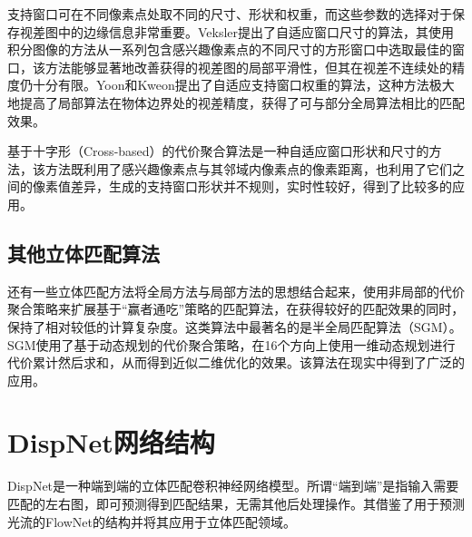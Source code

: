 支持窗口可在不同像素点处取不同的尺寸、形状和权重，而这些参数的选择对于保存视差图中的边缘信息非常重要。Veksler\cite{veksler2003fast}提出了自适应窗口尺寸的算法，其使用积分图像的方法从一系列包含感兴趣像素点的不同尺寸的方形窗口中选取最佳的窗口，该方法能够显著地改善获得的视差图的局部平滑性，但其在视差不连续处的精度仍十分有限。Yoon和Kweon\cite{yoon2005locally}提出了自适应支持窗口权重的算法，这种方法极大地提高了局部算法在物体边界处的视差精度，获得了可与部分全局算法相比的匹配效果。

基于十字形（Cross-based）的代价聚合算法\cite{zhang2009cross}是一种自适应窗口形状和尺寸的方法，该方法既利用了感兴趣像素点与其邻域内像素点的像素距离，也利用了它们之间的像素值差异，生成的支持窗口形状并不规则，实时性较好，得到了比较多的应用。
\subsection{其他立体匹配算法}
还有一些立体匹配方法将全局方法与局部方法的思想结合起来，使用非局部的代价聚合策略来扩展基于“赢者通吃”策略的匹配算法，在获得较好的匹配效果的同时，保持了相对较低的计算复杂度。这类算法中最著名的是半全局匹配算法（SGM）\cite{Hirschmuller08}。SGM使用了基于动态规划的代价聚合策略，在16个方向上使用一维动态规划进行代价累计然后求和，从而得到近似二维优化的效果。该算法在现实中得到了广泛的应用。


%




\section{DispNet网络结构}
DispNet是一种端到端的立体匹配卷积神经网络模型。所谓“端到端”是指输入需要匹配的左右图，即可预测得到匹配结果，无需其他后处理操作。其借鉴了用于预测光流的FlowNet\cite{dosovitskiy2015flownet}的结构并将其应用于立体匹配领域。

